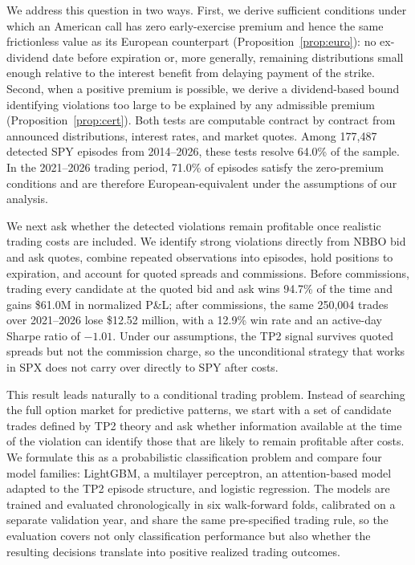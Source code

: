 \documentclass[sigconf,review]{acmart}
\begin{document}
We address this question in two ways. First, we derive sufficient conditions under which an American call has zero early-exercise premium and hence the same frictionless value as its European counterpart (Proposition~\ref{prop:euro}): no ex-dividend date before expiration or, more generally, remaining distributions small enough relative to the interest benefit from delaying payment of the strike. Second, when a positive premium is possible, we derive a dividend-based bound identifying violations too large to be explained by any admissible premium (Proposition~\ref{prop:cert}). Both tests are computable contract by contract from announced distributions, interest rates, and market quotes. Among 177{,}487 detected SPY episodes from 2014--2026, these tests resolve 64.0\% of the sample. In the 2021--2026 trading period, 71.0\% of episodes satisfy the zero-premium conditions and are therefore European-equivalent under the assumptions of our analysis.

We next ask whether the detected violations remain profitable once realistic trading costs are included. We identify strong violations directly from NBBO bid and ask quotes, combine repeated observations into episodes, hold positions to expiration, and account for quoted spreads and commissions. Before commissions, trading every candidate at the quoted bid and ask wins 94.7\% of the time and gains \$61.0M in normalized P\&L; after commissions, the same 250{,}004 trades over 2021--2026 lose \$12.52 million, with a 12.9\% win rate and an active-day Sharpe ratio of $-1.01$. Under our assumptions, the TP2 signal survives quoted spreads but not the commission charge, so the unconditional strategy that works in SPX does not carry over directly to SPY after costs.

This result leads naturally to a conditional trading problem. Instead of searching the full option market for predictive patterns, we start with a set of candidate trades defined by TP2 theory and ask whether information available at the time of the violation can identify those that are likely to remain profitable after costs. We formulate this as a probabilistic classification problem and compare four model families: LightGBM, a multilayer perceptron, an attention-based model adapted to the TP2 episode structure, and logistic regression. The models are trained and evaluated chronologically in six walk-forward folds, calibrated on a separate validation year, and share the same pre-specified trading rule, so the evaluation covers not only classification performance but also whether the resulting decisions translate into positive realized trading outcomes.
\end{document}
